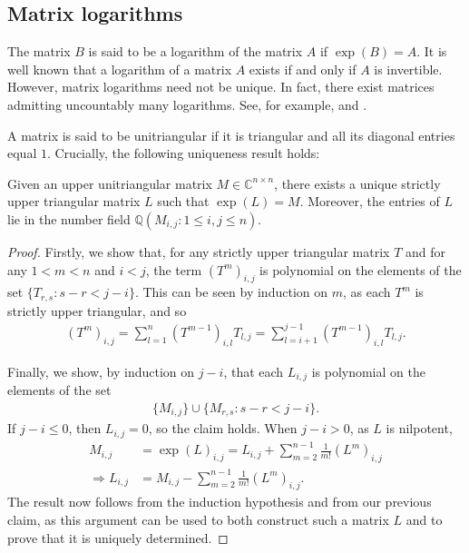 \subsection{Matrix logarithms}

The matrix $B$ is said to be a logarithm of the matrix $A$ if $\exp(B) = A$. It is well known that a logarithm of a matrix $A$ exists if and only if $A$ is invertible. However, matrix logarithms need not be unique. In fact, there exist matrices admitting uncountably many logarithms. See, for example, \cite{MatrixLogs1} and \cite{MatrixLogs2}.

A matrix is said to be unitriangular if it is triangular and all its diagonal entries equal $1$. Crucially, the following uniqueness result holds:

\begin{theorem}
\label{logarithm_uniqueness}
Given an upper unitriangular matrix $M \in \mathbb{C}^{n \times n}$, there exists a unique strictly upper triangular matrix $L$ such that $\exp(L)=M$. Moreover, the entries of $L$ lie in the number field $\mathbb{Q}(M_{i,j}: 1 \leq i,j \leq n)$.
\end{theorem}

\begin{proof}
Firstly, we show that, for any strictly upper triangular matrix $T$ and for any $1<m<n$ and $i<j$, the term $(T^{m})_{i,j}$ is polynomial on the elements of the set $\lbrace T_{r,s} : s-r<j-i \rbrace$. This can be seen by induction on $m$, as each $T^{m}$ is strictly upper triangular, and so
\begin{align*}
(T^{m})_{i,j} = \sum\limits_{l=1}^{n} (T^{m-1})_{i,l} T_{l,j} = \sum\limits_{l=i+1}^{j-1} (T^{m-1})_{i,l} T_{l,j} .
\end{align*}

Finally, we show, by induction on $j-i$, that each $L_{i,j}$ is polynomial on the elements of the set
\begin{align*}
\lbrace M_{i,j} \rbrace \cup \lbrace M_{r,s} : s-r < j-i \rbrace .
\end{align*}
If $j-i \leq 0$, then $L_{i,j}=0$, so the claim holds. When $j-i>0$, as $L$ is nilpotent,
\begin{align*}
M_{i,j} &= \exp(L)_{i,j} = L_{i,j} + \sum\limits_{m=2}^{n-1} \frac{1}{m!} (L^{m})_{i,j} \\ \Rightarrow L_{i,j} &= M_{i,j} - \sum\limits_{m=2}^{n-1} \frac{1}{m!} (L^{m})_{i,j} .
\end{align*}
The result now follows from the induction hypothesis and from our previous claim, as this argument can be used to both construct such a matrix $L$ and to prove that it is uniquely determined.
\end{proof}
